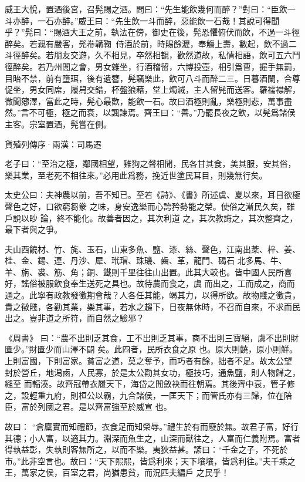 \documentclass[12pt,a4paper]{ctexbook}
\begin{document}
威王大悅，置酒後宮，召髡賜之酒。問曰：“先生能飲幾何而醉？”對曰：“臣飲一斗亦醉，一石亦醉。”威王曰：“先生飲一斗而醉，惡能飲一石哉！其說可得聞乎？”髡曰：“賜酒大王之前，執法在傍，御史在後，髡恐懼俯伏而飲，不過一斗徑醉矣。若親有嚴客，髡帣韝鞠，侍酒於前，時賜餘瀝，奉觴上壽，數起，飲不過二斗徑醉矣。若朋友交遊，久不相見，卒然相覩，歡然道故，私情相語，飲可五六鬥徑醉矣。若乃州閭之會，男女雜坐，行酒稽留，六博投壺，相引爲曹，握手無罰，目眙不禁，前有墮珥，後有遺簪，髡竊樂此，飲可八斗而醉二三。日暮酒闌，合尊促坐，男女同席，履舄交錯，杯盤狼藉，堂上燭滅，主人留髡而送客。羅襦襟解，微聞薌澤，當此之時，髡心最歡，能飲一石。故曰酒極則亂，樂極則悲，萬事盡然。”言不可極，極之而衰，以諷諫焉。齊王曰：“善。”乃罷長夜之飲，以髡爲諸侯主客。宗室置酒，髡嘗在側。\par
貨殖列傳序·兩漢：司馬遷 \par
老子曰：“至治之極，鄰國相望，雞狗之聲相聞，民各甘其食，美其服，安其俗，樂其業，至老死不相往來。”必用此爲務，挽近世塗民耳目，則幾無行矣。\par
太史公曰：夫神農以前，吾不知已。至若《詩》、《書》所述虞、夏以來，耳目欲極聲色之好，口欲窮芻豢 之味，身安逸樂而心誇矜勢能之榮。使俗之漸民久矣，雖戶說以眇 論，終不能化。故善者因之，其次利道 之，其次教誨之，其次整齊之，最下者與之爭。\par
夫山西饒材、竹、旄、玉石，山東多魚、鹽、漆、絲、聲色，江南出棻、梓、姜、桂、金、錫、連、丹沙、犀、玳瑁、珠璣、齒、革，龍門、碣石 北多馬、牛、羊、旃、裘、筋、角；銅、鐵則千里往往山出置。此其大較也。皆中國人民所喜好，謠俗被服飲食奉生送死之具也。故待農而食之，虞 而出之，工而成之，商而通之。此寧有政教發徵期會哉？人各任其能，竭其力，以得所欲。故物賤之徵貴，貴之徵賤，各勸其業，樂其事，若水之趨下，日夜無休時，不召而自來，不求而民出之。豈非道之所符，而自然之驗邪？\par
《周書》 曰：“農不出則乏其食，工不出則乏其事，商不出則三寶絕，虞不出則財匱少。”財匱少而山澤不闢 矣。此四者，民所衣食之原 也。原大則饒，原小則鮮。上則富國，下則富家。貧富之道，莫之奪予，而巧者有餘，拙者不足。故太公望 封於營丘，地潟鹵，人民寡，於是太公勸其女功，極技巧，通魚鹽，則人物歸之， 繦至 而輻湊。故齊冠帶衣履天下，海岱之閒斂袂而往朝焉。其後齊中衰，管子修之，設輕重九府，則桓公以霸，九合諸侯，一匡天下；而管氏亦有三歸，位在陪臣，富於列國之君。是以齊富強至於威宣 也。\par
故曰： “倉廩實而知禮節，衣食足而知榮辱。”禮生於有而廢於無。故君子富，好行其德；小人富，以適其力。淵深而魚生之，山深而獸往之，人富而仁義附焉。富者得執益彰，失執則客無所之，以而不樂。夷狄益甚。諺曰：“千金之子，不死於市。”此非空言也。故曰：“天下熙熙，皆爲利來；天下壤壤，皆爲利往。”夫千乘之王，萬家之侯，百室之君，尚猶患貧，而況匹夫編戶 之民乎！\par
\end{document}
